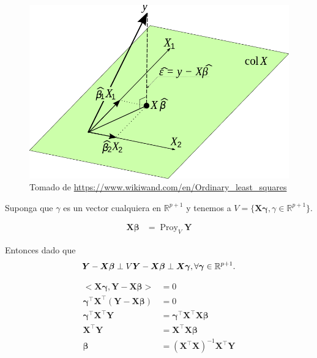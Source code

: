 \documentclass[
  12pt,
]{book}
\theoremstyle{definition}
\theoremstyle{definition}
\theoremstyle{definition}
\theoremstyle{remark}
\begin{document}
\begin{figure}
\centering
\includegraphics{manual_figures/ols.png}
\caption{Tomado de \url{https://www.wikiwand.com/en/Ordinary_least_squares}}
\end{figure}

Suponga que \(\gamma\) es un vector cualquiera en \(\mathbb{R}^{p+1}\) y tenemos a \(V = \{\boldsymbol{X}\boldsymbol{\gamma}, \gamma \in \mathbb{R}^{p+1}\}\).

\begin{align*}
\boldsymbol{X}\boldsymbol{\beta}
 &= \operatorname{Proy}_{V} \boldsymbol{Y}
\end{align*}

Entonces dado que
\begin{equation*}
\boldsymbol{Y}-\boldsymbol{X}\boldsymbol{\beta} \perp V \\
\boldsymbol{Y}-\boldsymbol{X}\boldsymbol{\beta} \perp \boldsymbol{X}\boldsymbol{\gamma}, \forall \boldsymbol{\gamma} \in \mathbb{R}^{p+1}.
\end{equation*}

\begin{align*}
<\boldsymbol{X}\boldsymbol{\gamma}, \boldsymbol{Y}-\boldsymbol{X}\boldsymbol{\beta} > &=  0 \\
 \boldsymbol{\gamma}^{\top}\boldsymbol{X}^{\top}(\boldsymbol{Y}-\boldsymbol{X}\boldsymbol{\beta}) &=  0 \\
 \boldsymbol{\gamma}^{\top}\boldsymbol{X}^{\top}\boldsymbol{Y} &= \boldsymbol{\gamma}^{\top} \boldsymbol{X}^{\top} \boldsymbol{X}\boldsymbol{\beta}  \\
  \boldsymbol{X}^{\top}\boldsymbol{Y} &=  \boldsymbol{X}^{\top} \boldsymbol{X}\boldsymbol{\beta}  \\
  \boldsymbol{\beta}  &=  (\boldsymbol{X}^{\top} \boldsymbol{X})^{-1} \boldsymbol{X}^{\top}\boldsymbol{Y} 
\end{align*}
\end{document}
